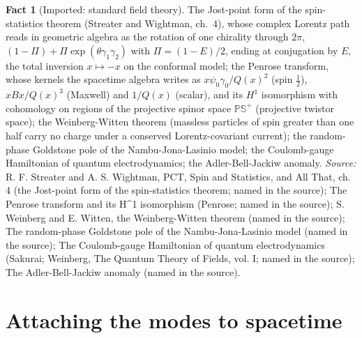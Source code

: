 \documentclass[11pt]{article}
\theoremstyle{definition}
\newtheorem{fact}[theorem]{Fact}
\theoremstyle{plain}
\providecommand{\PCS}{}\renewcommand{\PCS}{\mathbb{P}{\mathbb{S}^{+}}}
\begin{document}
\begin{fact}[Imported: standard field theory]\label{c:field-theory.imported-standard-field-theory}
The Jost-point form of the spin-statistics theorem (Streater and Wightman, ch.~4), whose complex Lorentz path reads in geometric algebra as the rotation of one chirality through $2\pi$, $(1-\Pi) + \Pi\exp(\theta\gamma_1\gamma_2)$ with $\Pi = (1 - E)/2$, ending at conjugation by $E$, the total inversion $x \mapsto -x$ on the conformal model; the Penrose transform, whose kernels the spacetime algebra writes as $x\psi_0\gamma_0/Q(x)^2$ (spin $\tfrac12$), $xBx/Q(x)^3$ (Maxwell) and $1/Q(x)$ (scalar), and its $H^1$ isomorphism with cohomology on regions of the projective spinor space $\PCS$ (projective twistor space); the Weinberg-Witten theorem (massless particles of spin greater than one half carry no charge under a conserved Lorentz-covariant current); the random-phase Goldstone pole of the Nambu-Jona-Lasinio model; the Coulomb-gauge Hamiltonian of quantum electrodynamics; the Adler-Bell-Jackiw anomaly.
\emph{Source:} R. F. Streater and A. S. Wightman, PCT, Spin and Statistics, and All That, ch. 4 (the Jost-point form of the spin-statistics theorem; named in the source); The Penrose transform and its H\^{}1 isomorphism (Penrose; named in the source); S. Weinberg and E. Witten, the Weinberg-Witten theorem (named in the source); The random-phase Goldstone pole of the Nambu-Jona-Lasinio model (named in the source); The Coulomb-gauge Hamiltonian of quantum electrodynamics (Sakurai; Weinberg, The Quantum Theory of Fields, vol. I; named in the source); The Adler-Bell-Jackiw anomaly (named in the source).
\end{fact}

\section{Attaching the modes to spacetime}
\end{document}
